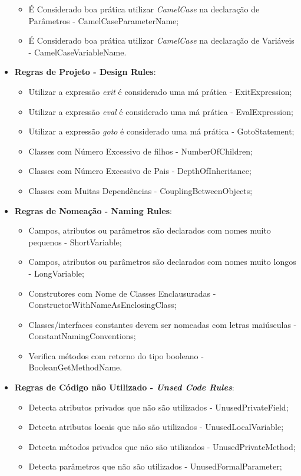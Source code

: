 \begin{itemize}
\begin{itemize}
			\item É Considerado boa prática utilizar \textit{CamelCase} na declaração
            de Parâmetros - CamelCaseParameterName;
			\item É Considerado boa prática utilizar \textit{CamelCase} na declaração
            de Variáveis - CamelCaseVariableName.
		\end{itemize}
  \item \textbf{Regras de Projeto - Design Rules}:
		\begin{itemize}
			\item Utilizar a expressão \textit{exit} é considerado uma má prática - ExitExpression;
			\item Utilizar a expressão \textit{eval} é considerado uma má prática - EvalExpression;
			\item Utilizar a expressão \textit{goto} é considerado uma má prática - GotoStatement;
			\item Classes com Número Excessivo de filhos - NumberOfChildren;
			\item Classes com Número Excessivo de Pais - DepthOfInheritance;
			\item Classes com Muitas Dependências - CouplingBetweenObjects;
		\end{itemize}
  \item \textbf{Regras de Nomeação - Naming Rules}:
		\begin{itemize}
			\item Campos, atributos ou parâmetros são declarados com nomes muito
            pequenos - ShortVariable;
			\item Campos, atributos ou parâmetros são declarados com nomes muito
            longos - LongVariable;
      \item Construtores com Nome de Classes Enclausuradas -
            ConstructorWithNameAsEnclosingClass;
      \item Classes/interfaces constantes devem ser nomeadas com letras
            maiúsculas - ConstantNamingConventions;
      \item Verifica métodos com retorno do tipo booleano - BooleanGetMethodName.
		\end{itemize}
  \item \textbf{Regras de Código não Utilizado - \textit{Unsed Code Rules}}:
    \begin{itemize}
      \item Detecta atributos privados que não são utilizados - UnusedPrivateField;
      \item Detecta atributos locais que não são utilizados - UnusedLocalVariable;
      \item Detecta métodos privados que não são utilizados - UnusedPrivateMethod;
      \item Detecta parâmetros que não são utilizados - UnusedFormalParameter;
    \end{itemize}
\end{itemize}

